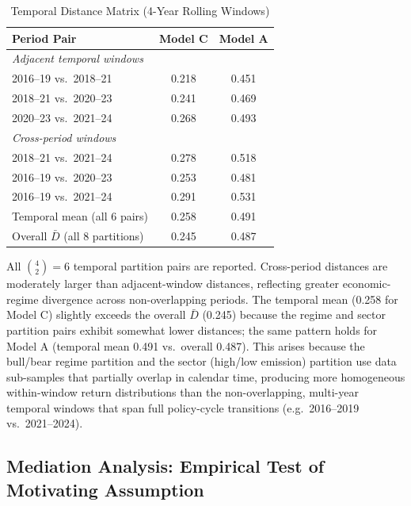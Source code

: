 \documentclass[12pt]{article}
\begin{document}
\begin{table}[H]
\centering
\caption{Temporal Distance Matrix (4-Year Rolling Windows)}
\label{tab:temporal_distance}
\small
\begin{tabular}{lcc}
\toprule
Period Pair & Model C & Model A \\
\midrule
\multicolumn{3}{l}{\textit{Adjacent temporal windows}} \\
2016--19 vs.\ 2018--21 & 0.218 & 0.451 \\
2018--21 vs.\ 2020--23 & 0.241 & 0.469 \\
2020--23 vs.\ 2021--24 & 0.268 & 0.493 \\
\multicolumn{3}{l}{\textit{Cross-period windows}} \\
2018--21 vs.\ 2021--24 & 0.278 & 0.518 \\
2016--19 vs.\ 2020--23 & 0.253 & 0.481 \\
2016--19 vs.\ 2021--24 & 0.291 & 0.531 \\
\midrule
Temporal mean (all 6 pairs) & 0.258 & 0.491 \\
Overall $\bar{D}$ (all 8 partitions) & 0.245 & 0.487 \\
\bottomrule
\end{tabular}
\begin{tablenotes}
\footnotesize
\item All $\binom{4}{2}=6$ temporal partition pairs are reported.
Cross-period distances are moderately larger than adjacent-window distances,
reflecting greater economic-regime divergence across non-overlapping periods.
The temporal mean (0.258 for Model C) slightly exceeds the overall $\bar{D}$
(0.245) because the regime and sector partition pairs exhibit somewhat lower
distances; the same pattern holds for Model A (temporal mean 0.491 vs.\
overall 0.487). This arises because the bull/bear regime partition and the
sector (high/low emission) partition use data sub-samples that partially
overlap in calendar time, producing more homogeneous within-window return
distributions than the non-overlapping, multi-year temporal windows that
span full policy-cycle transitions (e.g.\ 2016--2019 vs.\ 2021--2024).
\end{tablenotes}
\end{table}

\subsection{Mediation Analysis: Empirical Test of Motivating Assumption}
\label{sec:mechanism_test}
\end{document}
